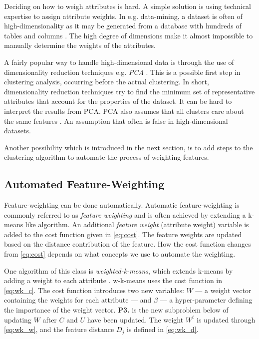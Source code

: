 \documentclass[../report.tex]{subfiles}
\begin{document}
Deciding on how to weigh attributes is hard. A simple solution is using technical expertise to assign attribute weights. In e.g. data-mining, a dataset is often of high-dimensionality as it may be generated from a database with hundreds of tables and columns \cite{Jing2007}. The high degree of dimensions make it almost impossible to manually determine the weights of the attributes.

A fairly popular way to handle high-dimensional data is through the use of dimensionality reduction techniques e.g. \textit{PCA} \cite{Jolliffe2005,van2009}. This is a possible first step in clustering analysis, occurring before the actual clustering. In short, dimensionality reduction techniques try to find the minimum set of representative attributes that account for the properties of the dataset. It can be hard to interpret the results from PCA. PCA also assumes that all clusters care about the same features \cite{Deng2010}. An assumption that often is false in high-dimensional datasets.

Another possibility which is introduced in the next section, is to add steps to the clustering algorithm to automate the process of weighting features.

\subsection{Automated Feature-Weighting}
Feature-weighting can be done automatically. Automatic feature-weighting is commonly referred to as \textit{feature weighting} and is often achieved by extending a k-means like algorithm. An additional \textit{feature weight} (attribute weight) variable is added to the cost function given in \cref{eq:cost}. The feature weights are updated based on the distance contribution of the feature. How the cost function changes from \cref{eq:cost} depends on what concepts we use to automate the weighting.

One algorithm of this class is \textit{weighted-k-means}, which extends k-means by adding a weight to each attribute \cite{huang2005automated}. w-k-means uses the cost function in \cref{eq:wk_c}. The cost function introduces two new variables: $W$ --- a weight vector containing the weights for each attribute --- and $\beta$ --- a hyper-parameter defining the importance of the weight vector. \textbf{P3.} is the new subproblem below of updating $W$ after $C$ and $U$ have been updated. The weight $W^t$ is updated through \cref{eq:wk_w}, and the feature distance $D_j$ is defined in \cref{eq:wk_d}.
\end{document}
